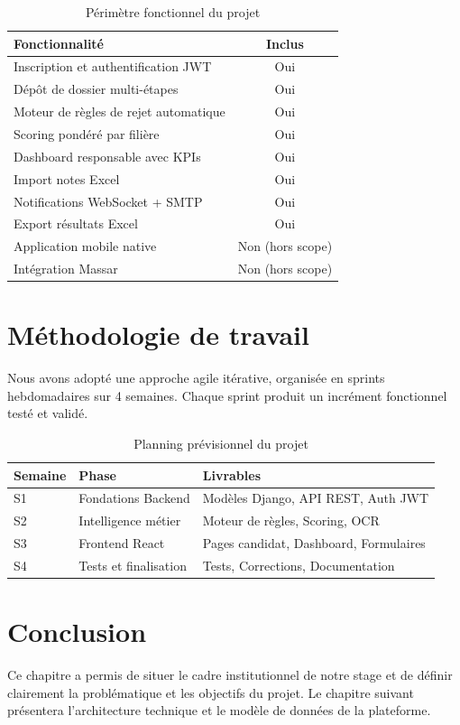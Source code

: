 \begin{table}[htbp]
  \centering
  \caption{Périmètre fonctionnel du projet}
  \begin{tabularx}{\textwidth}{@{} X c @{}}
    \toprule
    \textbf{Fonctionnalité} & \textbf{Inclus} \\
    \midrule
    Inscription et authentification JWT & Oui \\
    Dépôt de dossier multi-étapes & Oui \\
    Moteur de règles de rejet automatique & Oui \\
    Scoring pondéré par filière & Oui \\
    Dashboard responsable avec KPIs & Oui \\
    Import notes Excel & Oui \\
    Notifications WebSocket + SMTP & Oui \\
    Export résultats Excel & Oui \\
    Application mobile native & Non (hors scope) \\
    Intégration Massar & Non (hors scope) \\
    \bottomrule
  \end{tabularx}
  \label{tab:perimetre-fonctionnel}
\end{table}

\section{Méthodologie de travail}
\label{methodologie-de-travail}

Nous avons adopté une approche agile itérative, organisée en sprints hebdomadaires sur 4 semaines. Chaque sprint produit un incrément fonctionnel testé et validé.

\begin{table}[htbp]
  \centering
  \caption{Planning prévisionnel du projet}
  \begin{tabularx}{\textwidth}{@{} l l X @{}}
    \toprule
    \textbf{Semaine} & \textbf{Phase} & \textbf{Livrables} \\
    \midrule
    S1 & Fondations Backend & Modèles Django, API REST, Auth JWT \\
    S2 & Intelligence métier & Moteur de règles, Scoring, OCR \\
    S3 & Frontend React & Pages candidat, Dashboard, Formulaires \\
    S4 & Tests et finalisation & Tests, Corrections, Documentation \\
    \bottomrule
  \end{tabularx}
  \label{tab:planning}
\end{table}

\section{Conclusion}
\label{conclusion-ch1}

Ce chapitre a permis de situer le cadre institutionnel de notre stage et de définir clairement la problématique et les objectifs du projet. Le chapitre suivant présentera l'architecture technique et le modèle de données de la plateforme.
